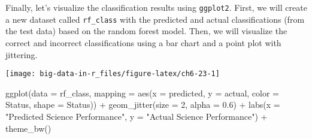 \documentclass[
]{book}
\newenvironment{Shaded}{\begin{snugshade}}{\end{snugshade}}
\newcommand{\AttributeTok}[1]{\textcolor[rgb]{0.77,0.63,0.00}{#1}}
\newcommand{\ConstantTok}[1]{\textcolor[rgb]{0.00,0.00,0.00}{#1}}
\newcommand{\DecValTok}[1]{\textcolor[rgb]{0.00,0.00,0.81}{#1}}
\newcommand{\FloatTok}[1]{\textcolor[rgb]{0.00,0.00,0.81}{#1}}
\newcommand{\FunctionTok}[1]{\textcolor[rgb]{0.00,0.00,0.00}{#1}}
\newcommand{\NormalTok}[1]{#1}
\newcommand{\OtherTok}[1]{\textcolor[rgb]{0.56,0.35,0.01}{#1}}
\newcommand{\SpecialCharTok}[1]{\textcolor[rgb]{0.00,0.00,0.00}{#1}}
\newcommand{\StringTok}[1]{\textcolor[rgb]{0.31,0.60,0.02}{#1}}
\begin{document}
Finally, let's visualize the classification results using \texttt{ggplot2}. First, we will create a new dataset called \texttt{rf\_class} with the predicted and actual classifications (from the test data) based on the random forest model. Then, we will visualize the correct and incorrect classifications using a bar chart and a point plot with jittering.

\begin{Shaded}
\end{Shaded}

\texttt{[image: big-data-in-r\_files/figure-latex/ch6-23-1]}

\begin{Shaded}
\begin{Highlighting}[]
\FunctionTok{ggplot}\NormalTok{(}\AttributeTok{data =}\NormalTok{ rf\_class, }
       \AttributeTok{mapping =} \FunctionTok{aes}\NormalTok{(}\AttributeTok{x =}\NormalTok{ predicted, }\AttributeTok{y =}\NormalTok{ actual, }
                     \AttributeTok{color =}\NormalTok{ Status, }\AttributeTok{shape =}\NormalTok{ Status)) }\SpecialCharTok{+}
  \FunctionTok{geom\_jitter}\NormalTok{(}\AttributeTok{size =} \DecValTok{2}\NormalTok{, }\AttributeTok{alpha =} \FloatTok{0.6}\NormalTok{) }\SpecialCharTok{+}
  \FunctionTok{labs}\NormalTok{(}\AttributeTok{x =} \StringTok{"Predicted Science Performance"}\NormalTok{,}
       \AttributeTok{y =} \StringTok{"Actual Science Performance"}\NormalTok{) }\SpecialCharTok{+}
  \FunctionTok{theme\_bw}\NormalTok{()}
\end{Highlighting}
\end{Shaded}
\end{document}

